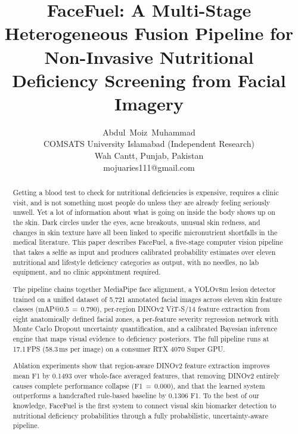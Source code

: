 \documentclass[journal]{IEEEtran}
\begin{document}
\title{FaceFuel: A Multi-Stage Heterogeneous Fusion Pipeline
for Non-Invasive Nutritional Deficiency Screening from Facial Imagery}

\author{Abdul~Moiz~Muhammad\\
COMSATS University Islamabad (Independent Research)\\
Wah Cantt, Punjab, Pakistan\\
mojuaries111@gmail.com}

\maketitle

\begin{abstract}
Getting a blood test to check for nutritional deficiencies is expensive,
requires a clinic visit, and is not something most people do unless they are
already feeling seriously unwell. Yet a lot of information about what is going
on inside the body shows up on the skin. Dark circles under the eyes,
acne breakouts, unusual skin redness, and changes in skin texture have all
been linked to specific micronutrient shortfalls in the medical literature.
This paper describes FaceFuel, a five-stage computer vision pipeline that takes
a selfie as input and produces calibrated probability estimates over eleven
nutritional and lifestyle deficiency categories as output, with no needles,
no lab equipment, and no clinic appointment required.

The pipeline chains together MediaPipe face alignment,
a YOLOv8m lesion detector trained on a unified dataset of 5{,}721 annotated
facial images across eleven skin feature classes (mAP@0.5$\,=\,$0.790),
per-region DINOv2 ViT-S/14 feature extraction from eight anatomically defined
facial zones, a per-feature severity regression network with Monte Carlo Dropout
uncertainty quantification, and a calibrated Bayesian inference engine that maps
visual evidence to deficiency posteriors.
The full pipeline runs at 17.1\,FPS (58.3\,ms per image) on a consumer
RTX 4070 Super GPU.

Ablation experiments show that region-aware DINOv2 feature extraction
improves mean F1 by 0.1493 over whole-face averaged features, that removing
DINOv2 entirely causes complete performance collapse (F1$\,=\,$0.000), and that
the learned system outperforms a handcrafted rule-based baseline by 0.1306 F1.
To the best of our knowledge, FaceFuel is the first system to connect visual
skin biomarker detection to nutritional deficiency probabilities through a fully
probabilistic, uncertainty-aware pipeline.
\end{abstract}
\end{document}
